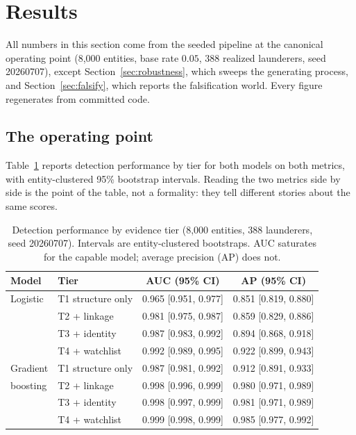 \documentclass[11pt]{article}
\begin{document}
\section{Results}
\label{sec:results}

All numbers in this section come from the seeded pipeline at the canonical operating point (8{,}000
entities, base rate $0.05$, 388 realized launderers, seed 20260707), except
Section~\ref{sec:robustness}, which sweeps the generating process, and Section~\ref{sec:falsify},
which reports the falsification world. Every figure regenerates from committed code.

\subsection{The operating point}
\label{sec:operating-point}

Table~\ref{tab:tier-perf} reports detection performance by tier for both models on both metrics, with
entity-clustered 95\% bootstrap intervals. Reading the two metrics side by side is the point of the
table, not a formality: they tell different stories about the same scores.

\begin{table}[htbp]
\centering
\caption{Detection performance by evidence tier (8{,}000 entities, 388 launderers, seed 20260707).
Intervals are entity-clustered bootstraps. AUC saturates for the capable model; average precision
(AP) does not.}
\label{tab:tier-perf}
\begin{tabular}{llcc}
\toprule
Model & Tier & AUC (95\% CI) & AP (95\% CI) \\
\midrule
Logistic & T1 structure only & 0.965 [0.951, 0.977] & 0.851 [0.819, 0.880] \\
         & T2 + linkage      & 0.981 [0.975, 0.987] & 0.859 [0.829, 0.886] \\
         & T3 + identity     & 0.987 [0.983, 0.992] & 0.894 [0.868, 0.918] \\
         & T4 + watchlist    & 0.992 [0.989, 0.995] & 0.922 [0.899, 0.943] \\
\addlinespace
Gradient & T1 structure only & 0.987 [0.981, 0.992] & 0.912 [0.891, 0.933] \\
boosting & T2 + linkage      & 0.998 [0.996, 0.999] & 0.980 [0.971, 0.989] \\
         & T3 + identity     & 0.998 [0.997, 0.999] & 0.981 [0.971, 0.989] \\
         & T4 + watchlist    & 0.999 [0.998, 0.999] & 0.985 [0.977, 0.992] \\
\bottomrule
\end{tabular}
\end{table}
\end{document}
